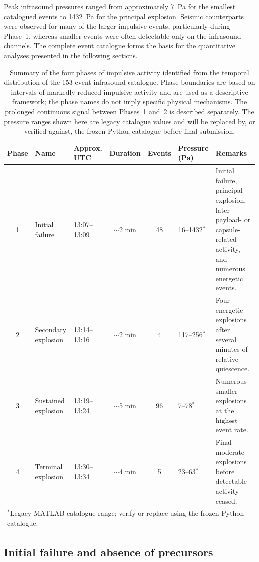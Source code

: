 \documentclass[]{seismica}
\begin{document}
Peak infrasound pressures ranged from approximately 7~Pa for the smallest catalogued events to 1432~Pa for the principal explosion. Seismic counterparts were observed for many of the larger impulsive events, particularly during Phase~1, whereas smaller events were often detectable only on the infrasound channels. The complete event catalogue forms the basis for the quantitative analyses presented in the following sections.

\begin{table}[t]
\caption{Summary of the four phases of impulsive activity identified from the
temporal distribution of the 153-event infrasound catalogue. Phase boundaries
are based on intervals of markedly reduced impulsive activity and are used as
a descriptive framework; the phase names do not imply specific physical
mechanisms. The prolonged continuous signal between Phases~1 and~2 is described
separately. The pressure ranges shown here are legacy catalogue values and
will be replaced by, or verified against, the frozen Python catalogue before
final submission.}
\label{tab:phases}
\centering
\small
\begin{tabularx}{\textwidth}{c l l c c l X}
\hline
Phase & Name & Approx. UTC & Duration & Events & Pressure (Pa) & Remarks \\
\hline
1 & Initial failure
  & 13:07--13:09
  & $\sim$2 min
  & 48
  & 16--1432$^{*}$
  & Initial failure, principal explosion, later payload- or
    capsule-related activity, and numerous energetic events. \\
2 & Secondary explosion
  & 13:14--13:16
  & $\sim$2 min
  & 4
  & 117--256$^{*}$
  & Four energetic explosions after several minutes of relative quiescence. \\
3 & Sustained explosion
  & 13:19--13:24
  & $\sim$5 min
  & 96
  & 7--78$^{*}$
  & Numerous smaller explosions at the highest event rate. \\
4 & Terminal explosion
  & 13:30--13:34
  & $\sim$4 min
  & 5
  & 23--63$^{*}$
  & Final moderate explosions before detectable activity ceased. \\
\hline
\multicolumn{7}{l}{\footnotesize
$^{*}$Legacy MATLAB catalogue range; verify or replace using the frozen Python catalogue.}
\end{tabularx}
\end{table}

\subsection{Initial failure and absence of precursors}
\label{sec:results_onset}
\end{document}
